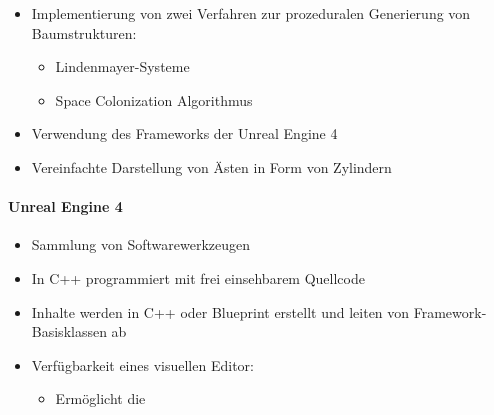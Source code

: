 \begin{itemize}
	\item Implementierung von zwei Verfahren zur prozeduralen Generierung von Baumstrukturen:
	\begin{itemize}
		\item Lindenmayer-Systeme
		\item Space Colonization Algorithmus
	\end{itemize}
	\item Verwendung des Frameworks der Unreal Engine 4
	\item Vereinfachte Darstellung von Ästen in Form von Zylindern
\end{itemize}

\newpage
{}
\paragraph{Unreal Engine 4\\}

\begin{itemize}
	\item Sammlung von Softwarewerkzeugen
	\item In C++ programmiert mit frei einsehbarem Quellcode
	\item Inhalte werden in C++ oder Blueprint erstellt und leiten von Framework-Basisklassen ab
	\item Verfügbarkeit eines visuellen Editor:
	\begin{itemize}
		\item Ermöglicht die 
	\end{itemize}
\end{itemize}


\iffalse
\newpage
{}

